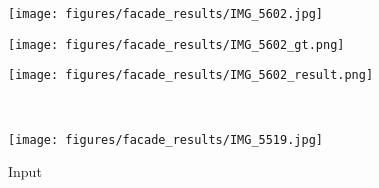 \documentclass[10pt,twocolumn,letterpaper]{article}
\begin{document}
\captionsetup[subfigure]{labelformat=empty}
\begin{subfigure}{.155\textwidth}
\centering
\texttt{[image: figures/facade\_results/IMG\_5602.jpg]}
\end{subfigure}
\begin{subfigure}{.155\textwidth}
\centering
\texttt{[image: figures/facade\_results/IMG\_5602\_gt.png]}
\end{subfigure}
\begin{subfigure}{.155\textwidth}
\centering
\texttt{[image: figures/facade\_results/IMG\_5602\_result.png]}
\end{subfigure} \\[3pt]%
\begin{subfigure}{.155\textwidth}
\centering
\texttt{[image: figures/facade\_results/IMG\_5519.jpg]}
\caption{Input}
\end{subfigure}
\end{document}
